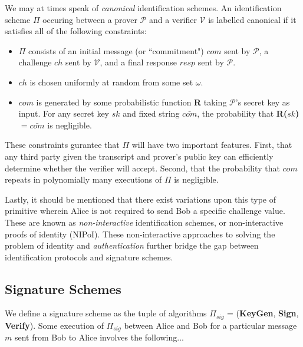 \noindent
We may at times speak of \emph{canonical} identification schemes. An identification scheme $\Pi$ occuring between a prover $\mathcal{P}$ and a verifier $\mathcal{V}$ is labelled canonical if it satisfies all of the following constraints:
\begin{itemize}
\item $\Pi$ consists of an initial message (or ``commitment") $com$ sent by $\mathcal{P}$, a challenge $ch$ sent by $\mathcal{V}$, and a final response $resp$ sent by $\mathcal{P}$.
\item $ch$ is chosen uniformly at random from some set $\omega$.
\item $com$ is generated by some probabilistic function \textbf{R} taking $\mathcal{P}$'s secret key as input. For any secret key $sk$ and fixed string $\bar{com}$, the probability that \textbf{R($sk$)} $= \bar{com}$ is negligible.
\end{itemize}

These constraints gurantee that $\Pi$ will have two important features. First, that any third party given the transcript and prover's public key can efficiently determine whether the verifier will accept. Second, that the probability that $com$ repeats in polynomially many executions of $\Pi$ is negligible.

Lastly, it should be mentioned that there exist variations upon this type of primitive wherein Alice is not required to send Bob a specific challenge value. These are known as \emph{non-interactive} identification schemes, or non-interactive proofs of identity (NIPoI). These non-interactive approaches to solving the problem of identity and \emph{authentication} further bridge the gap between identification protocols and signature schemes.

\subsection{Signature Schemes}

We define a signature scheme as the tuple of algorithms $\Pi_{sig}$ = (\textbf{KeyGen}, \textbf{Sign}, \textbf{Verify}). Some execution of $\Pi_{sig}$ between Alice and Bob for a particular message $m$ sent from Bob to Alice involves the following...\\

